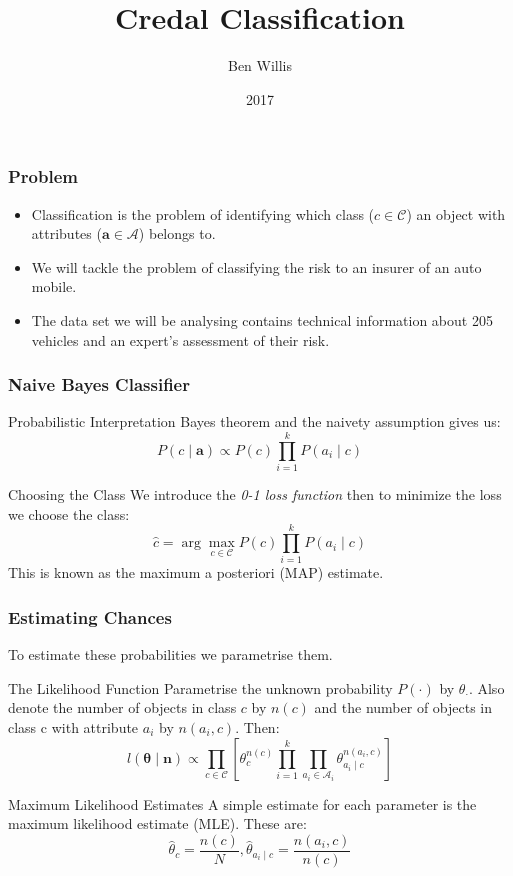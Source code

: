 \documentclass{beamer}
\title{Credal Classification}
\author{Ben Willis}
\institute{Durham University}
\date{2017}
\begin{document}
 
\frame{\titlepage}

\begin{frame}
	\frametitle{Problem}
	\begin{itemize}
		\item Classification is the problem of identifying which class ($c \in \mathcal{C}$) an object with attributes ($\mathbf{a} \in \mathcal{A}$) belongs to.
		\item We will tackle the problem of classifying the risk to an insurer of an auto mobile.
		\item The data set we will be analysing contains technical information about 205 vehicles and an expert's assessment of their risk.
	\end{itemize}
\end{frame}

\begin{frame}
	\frametitle{Naive Bayes Classifier}
		\begin{block}{Probabilistic Interpretation}
			Bayes theorem and the naivety assumption gives us:
			\begin{equation}
				P(c \mid \mathbf{a}) \propto P(c)\prod_{i=1}^{k}P(a_i \mid c)
			\end{equation}
		\end{block}
		\begin{block}{Choosing the Class}
			We introduce the \textit{0-1 loss function} then to minimize the loss we choose the class:
			\begin{equation}
				\hat c = \arg\max_{c \in \mathcal{C}} P(c)\prod_{i=1}^{k}P(a_i \mid c)
			\end{equation}
			This is known as the maximum a posteriori (MAP) estimate.
		\end{block}
\end{frame}

\begin{frame}
	\frametitle{Estimating Chances}
	To estimate these probabilities we parametrise them.
	\begin{block}{The Likelihood Function}
		Parametrise the unknown probability $P(\cdot)$ by $\theta_{\cdot}$.
		Also denote the number of objects in class $c$ by $n(c)$ and the number of objects in class c with attribute $a_i$ by $n(a_i, c)$. Then:
		\begin{equation}\label{likelihood function}
			l(\mathbf{\theta} \mid \mathbf{n}) \propto \prod_{c \in \mathcal{C}} \left[ \theta_c^{n(c)} \prod_{i=1}^k \prod_{a_i \in \mathcal{A}_i} \theta_{a_i \mid c}^{n(a_i, c)} \right]
		\end{equation}
	\end{block}
	\begin{block}{Maximum Likelihood Estimates}
		A simple estimate for each parameter is the maximum likelihood estimate (MLE). These are:
		\begin{equation}
			\hat{\theta}_c = \frac{n(c)}{N} , \hat{\theta}_{a_i \mid c} = \frac{n(a_i, c)}{n(c)}
		\end{equation}
	\end{block}
\end{frame}
\end{document}
